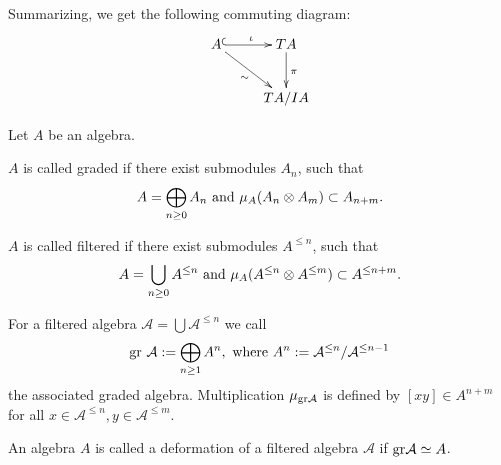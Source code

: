 Summarizing, we get the following commuting diagram:
$$\xymatrix{
A \ar@{^{(}->}[r]^\iota \ar[rd]_\sim& T A\ar[d]^\pi\\
& T A/I A\\
}$$
\en
\begin{defi}\label{defi04}
Let $A$ be an algebra.
\bn
\item $A$ is called graded if there exist submodules $A_n$, such that
$$A = \bigoplus_{n\geq 0} A_n\ \trm{and}\ \mu_A(A_n \otimes A_m) \subset A_{n+m}.$$
\item $A$ is called filtered if there exist submodules $A^{\leq n}$, such that
$$A = \bigcup_{n \geq 0} A^{\leq n}\ \mathrm{and}\ \mu_A(A^{\leq n} \otimes A^{\leq m}) \subset A^{\leq n + m}.$$
\item For a filtered algebra $\mathcal{A} = \bigcup \mathcal{A}^{\leq n}$ we call
$$\mathrm{gr} \ \mathcal{A} := \bigoplus_{n \geq 1} A^n,\ \mathrm{where}\ A^n := \mathcal{A}^{\leq n}/\mathcal{A}^{\leq n - 1}$$
the associated graded algebra. Multiplication $\mu_{\mathrm{gr} \mathcal{A}}$ is defined by $[x y] \in A^{n + m}$ for all $x \in \mathcal{A}^{\leq n}, y \in \mathcal{A}^{\leq m}$.
\item An algebra $A$ is called a deformation of a filtered algebra $\mathcal{A}$ if $\mathrm{gr} \mathcal{A} \simeq A$.
\en
{}
\end{defi}
